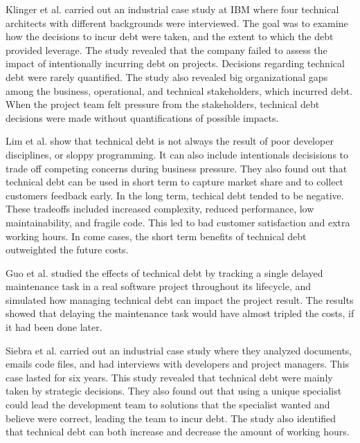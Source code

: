 
Klinger et al.\cite{p35-klinger} carried out an industrial case study at IBM where four technical architects with different backgrounds were interviewed. The goal was to examine how the decisions to incur debt were taken, and the extent to which the debt provided leverage\cite{p35-klinger}. The study revealed that the company failed to assess the impact of intentionally incurring debt on projects. Decisions regarding technical debt were rarely quantified. The study also revealed big organizational gaps among the business, operational, and technical stakeholders, which incurred debt. When the project team felt pressure from the stakeholders, technical debt decisions were made without quantifications of possible impacts.

Lim et al.\cite{lim-taksande} show that technical debt is not always the result of poor developer disciplines, or sloppy programming. It can also include intentionals decisisions to trade off competing concerns during business pressure. They also found out that technical debt can be used in short term to capture market share and to collect customers feedback early. In the long term, techical debt tended to be negative. These tradeoffs included increased complexity, reduced performance, low maintainability, and fragile code. This led to bad customer satisfaction and extra working hours. In come cases, the short term benefits of technical debt outweighted the future costs.

Guo et al.\cite{guo2011tracking} studied the effects of technical debt by tracking a single delayed maintenance task in a real software project throughout its lifecycle, and simulated how managing technical debt can impact the project result. The results showed that delaying the maintenance task would have almost tripled the costs, if it had been done later.

Siebra et al.\cite{p247-siebra} carried out an industrial case study where they analyzed documents, emails code files, and had interviews with developers and project managers. This case lasted for six years. This study revealed that technical debt were mainly taken by strategic decisions. They also found out that using a unique specialist could lead the development team to solutions that the specialist wanted and believe were correct, leading the team to incur debt. The study also identified that technical debt can both increase and decrease the amount of working hours.

